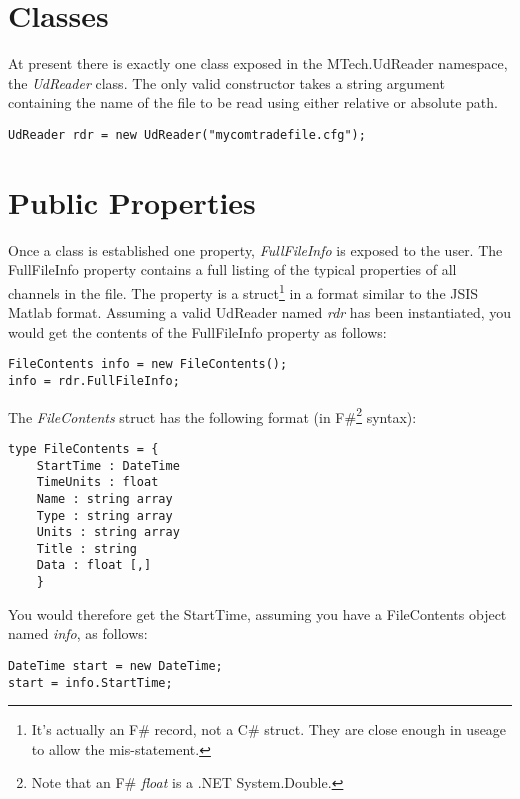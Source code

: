 \documentclass[11pt,letterpaper,article]{memoir} %
\begin{document}
\section{Classes}
At present there is exactly one class exposed in the MTech.UdReader namespace, the {\em UdReader} class. The only valid constructor takes a string argument containing the name of the file to be read using either relative or absolute path.

\lstset{language=C}
\begin{lstlisting}
UdReader rdr = new UdReader("mycomtradefile.cfg");
\end{lstlisting}

\section{Public Properties}
Once a class is established one property, {\em FullFileInfo} is exposed to the user. The FullFileInfo property contains a full listing of the typical properties of all channels in the file. The property is a struct\footnote{It's actually an F\# record, not a C\# struct. They are close enough in useage to allow the mis-statement.} in a format similar to the JSIS Matlab format. Assuming a valid UdReader named {\em rdr} has been instantiated, you would get the contents of the FullFileInfo property as follows:

\lstset{language=C}
\begin{lstlisting}
FileContents info = new FileContents();
info = rdr.FullFileInfo;
\end{lstlisting}

The {\em FileContents} struct has the following format (in F\#\footnote{Note that an F\# {\em float} is a .NET System.Double.} syntax):

\lstset{language=Caml}
\begin{lstlisting}
type FileContents = { 
    StartTime : DateTime 
    TimeUnits : float 
    Name : string array 
    Type : string array 
    Units : string array 
    Title : string 
    Data : float [,]
    }
\end{lstlisting}

You would therefore get the StartTime, assuming you have a FileContents object named {\em info}, as follows:

\lstset{language=C}
\begin{lstlisting}
DateTime start = new DateTime;
start = info.StartTime;
\end{lstlisting}
\end{document}
